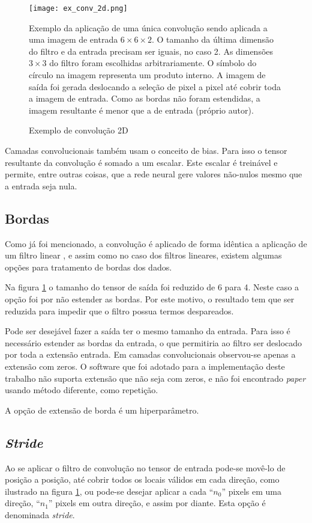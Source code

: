 \begin{figure}[!htb]
	\centering
	\texttt{[image: ex\_conv\_2d.png]}
	\caption{Exemplo de convolução 2D}
	\label{fig:ex_conv_2d}
	Exemplo da aplicação de uma única convolução sendo aplicada a uma imagem de
	entrada $6 \times 6 \times 2$. O tamanho da última dimensão do filtro e
	da entrada precisam ser iguais, no caso 2. As dimensões $3 \times 3$ do
	filtro foram escolhidas arbitrariamente. O símbolo do círculo na imagem
	representa um produto interno. A imagem de saída foi gerada deslocando
	a seleção de pixel a pixel até cobrir toda a
	imagem de entrada. Como as bordas não foram estendidas, a imagem
	resultante é menor que a de entrada (próprio autor).
\end{figure}

Camadas convolucionais também usam o conceito de bias. Para isso o tensor
resultante da convolução é somado a um escalar. Este escalar é treinável e
permite, entre outras coisas, que a rede neural gere valores não-nulos mesmo que
a entrada seja nula.

\subsection{Bordas} \label{ses:bordas}
Como já foi mencionado, a convolução é aplicado de forma idêntica a aplicação
de um filtro linear \cite{gonzalezwoods200708}, e assim como no caso dos
filtros lineares, existem algumas opções para tratamento de bordas dos dados.

Na figura \ref{fig:ex_conv_2d} o tamanho do tensor de saída foi reduzido
de 6 para 4. Neste caso a opção foi por não estender as bordas. Por
este motivo, o resultado tem que ser reduzida para impedir que o filtro
possua termos despareados.

Pode ser
desejável fazer a saída ter o mesmo tamanho da entrada. Para isso é necessário
estender as bordas da entrada, o que permitiria ao filtro ser deslocado por
toda a extensão entrada. Em camadas convolucionais observou-se apenas a
extensão com zeros. O software que foi adotado para a implementação deste
trabalho não suporta extensão que não seja com zeros, e não foi encontrado
\emph{paper} usando método diferente, como repetição.

A opção de extensão de borda é um hiperparâmetro.

\subsection{\emph{Stride}}
Ao se aplicar o filtro de convolução no tensor de entrada pode-se movê-lo de
posição a posição, até cobrir todos os locais válidos em cada direção, como
ilustrado na figura \ref{fig:ex_conv_2d}, ou pode-se desejar aplicar a cada
``$n_0$'' pixels em uma direção, ``$n_1$'' pixels em outra direção, e assim
por diante.  Esta opção é denominada \emph{stride}.

